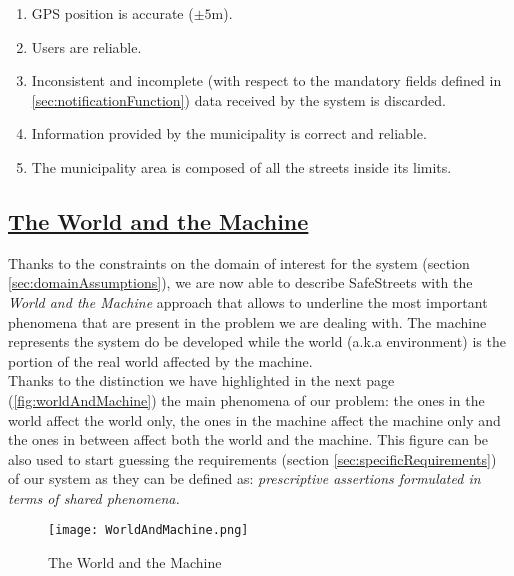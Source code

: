 	\begin{enumerate}[label=\textbf{DA\arabic*}]
		\item GPS position is accurate ($\pm5$m).
		\item Users are reliable.
		\item Inconsistent and incomplete (with respect to the mandatory fields defined in \ref{sec:notificationFunction}) data received by the system is discarded.
		\item Information provided by the municipality is correct and reliable.
		\item The municipality area is composed of all the streets inside its limits.
	\end{enumerate} 
	
\subsection[The World and the Machine]{\hyperlink{toc}{The World and the Machine}}
	Thanks to the constraints on the domain of interest for the system (section \ref{sec:domainAssumptions}), we are now able to describe SafeStreets with the \textit{World and the Machine} approach that allows to underline the most important phenomena that are present in the problem we are dealing with. The machine represents the system do be developed while the world (a.k.a environment) is the portion of the real world affected by the machine.\\
	
	Thanks to the distinction we have highlighted in the next page (\autoref{fig:worldAndMachine}) the main phenomena of our problem: the ones in the world affect the world only, the ones in the machine affect the machine only and the ones in between affect both the world and the machine. This figure can be also used to start guessing the requirements (section \ref{sec:specificRequirements}) of our system as they can be defined as: \textit{prescriptive assertions formulated in terms of shared phenomena.} 
	
	\begin{figure}[h]
		\centering
		\texttt{[image: WorldAndMachine.png]}
		\caption{\label{fig:worldAndMachine}The World and the Machine}
	\end{figure} 